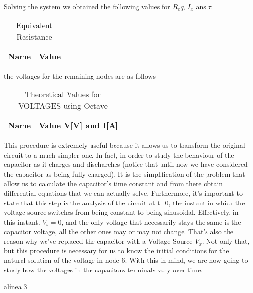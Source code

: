 Solving the system we obtained the following values for $R_eq$, $I_x$ ans $\tau$.

\begin{table}[H]
  \centering
  \begin{tabular}{|l|r|}
    \hline
    {\bf Name} & {\bf Value} \\ \hline
    
  \end{tabular}
  \caption{Equivalent Resistance}
  \label{tab:R_eq}
\end{table}

the voltages for the remaining nodes are as follows

\begin{table}[H]
  \centering
  \begin{tabular}{|l|r|}
    \hline
    {\bf Name} & {\bf Value V[V] and I[A]} \\ \hline
    
  \end{tabular}
  \caption{Theoretical Values for VOLTAGES using Octave}
  \label{tab:alinea2_voltagens_tab}
\end{table}

This procedure is extremely useful because it allows us to transform the original circuit to a much simpler one. In fact, in order to study the behaviour of the capacitor as it charges and discharches (notice that until now we have considered the capacitor as being fully charged). It is the simplification of the problem that allow us to calculate the capacitor's time constant and from there obtain differential equations that we can actually solve.
Furthermore, it's important to state that this step is the analysis of the circuit at t=0, the instant in which the voltage source switches from being constant to being sinusoidal. Effectively, in this instant, $V_{s}=0$, and the only voltage that necessarily stays the same is the capacitor voltage, all the other ones may or may not change. That's also the reason why we've replaced the capacitor with a Voltage Source $V_{x}$. Not only that, but
this procedure is necessary for us to know the initial conditions for the natural solution of the voltage in node 6.
With this in mind, we are now going to study how the voltages in the capacitors terminals vary over time.

alínea 3


